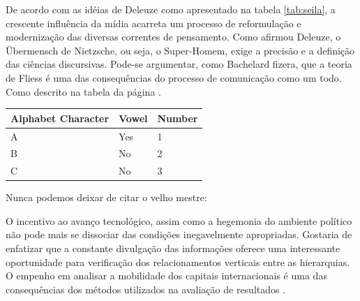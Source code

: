 \documentclass[font=plain,chapter=TITLE,section=Title,espaco=duplo,tocpage=plain,appendix=Name,floatnumber=continuous]{abnt}
\begin{document}
%
%
%
%
De acordo com as idéias de Deleuze como apresentado na tabela \ref{tab:seila},
a crescente influência da mídia acarreta um processo de
reformulação e modernização das diversas correntes de pensamento.  Como
afirmou Deleuze, o Übermensch de Nietzsche, ou seja, o Super-Homem, exige a
precisão e a definição das ciências discursivas.  Pode-se argumentar, como
Bachelard fizera, que a teoria de Fliess é uma das consequências do
processo de comunicação como um todo. Como descrito na tabela da
página \pageref{tab:seila}.

%
%
\begin{table}[h!b!p!]
\centering
\begin{tabular}{lll} %
\hline %
Alphabet Character & Vowel & Number \\ %
\hline
A & Yes & 1 \\ %
B & No & 2 \\
C & No & 3 \\
\hline
\end{tabular}
\label{quadro:outrola}
\end{table}

Nunca podemos deixar de citar o velho mestre:

\begin{citacao}
O incentivo ao avanço tecnológico, assim como a hegemonia do ambiente
político não pode mais se dissociar das condições inegavelmente
apropriadas. Gostaria de enfatizar que a constante divulgação das
informações oferece uma interessante oportunidade para verificação dos
relacionamentos verticais entre as hierarquias. O empenho em analisar a
mobilidade dos capitais internacionais é uma das consequências dos métodos
utilizados na avaliação de resultados \cite{semolini2002support}.
\end{citacao}
\end{document}
